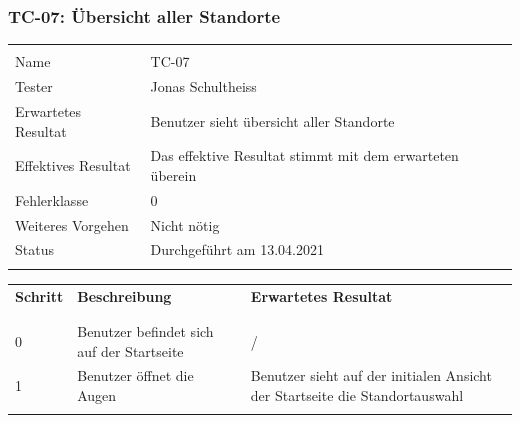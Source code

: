\subsubsection{TC-07: Übersicht aller Standorte}\label{tc-07}
\begin{table}[H]
  \begin{tabularx}{\textwidth}{l X}\hline \\
  Name & TC-07 \\
  Tester & Jonas Schultheiss \\
  Erwartetes Resultat & Benutzer sieht übersicht aller Standorte \\
  Effektives Resultat & Das effektive Resultat stimmt mit dem erwarteten überein \\
  Fehlerklasse & 0 \\
  Weiteres Vorgehen & Nicht nötig \\
  Status & Durchgeführt am 13.04.2021 \\
  \\\hline
  \end{tabularx}
\end{table}
\begin{table}[H]
  \begin{tabularx}{\textwidth}{l X X}
  \textbf{Schritt} & \textbf{Beschreibung} & \textbf{Erwartetes Resultat}\\ \\\hline \\
  0 & Benutzer befindet sich auf der Startseite  & / \\
  1 & Benutzer öffnet die Augen & Benutzer sieht auf der initialen Ansicht der Startseite die Standortauswahl \\
  \\\hline
  \end{tabularx}
\end{table}
\pagebreak
